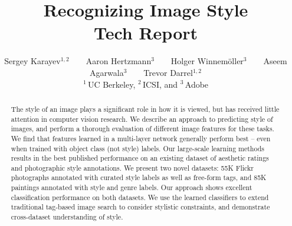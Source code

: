 \documentclass[10pt,twocolumn,letterpaper]{article}
\begin{document}
\title{
Recognizing Image Style\\
\large{Tech Report}
}

 \author{Sergey Karayev$^{1,2}$~~~~Aaron Hertzmann$^{3}$~~~~Holger Winnem\"{o}ller$^{3}$~~~~Aseem Agarwala$^{3}$~~~~Trevor Darrel$^{1,2}$\vspace{.4em}\\
$^1$\,UC Berkeley, $^2$\,ICSI, and $^3$\,Adobe\\
}

\maketitle

\begin{abstract}
The style of an image plays a significant role in how it is viewed, but has received little attention in computer vision research.
We describe an approach to predicting style of images, and perform a thorough evaluation of different image features for these tasks.
We find that features learned in a multi-layer network generally perform best -- even when trained with object class (not style) labels.
Our large-scale learning methods results in the best published performance on an existing dataset of aesthetic ratings and photographic style annotations.
We present two novel datasets: 55K Flickr photographs annotated with curated style labels as well as free-form tags, and 85K paintings annotated with style and genre labels.
Our approach shows excellent classification performance on both datasets.
We use the learned classifiers to extend traditional tag-based image search to consider stylistic constraints, and demonstrate cross-dataset understanding of style.
\end{abstract}


\end{document}
